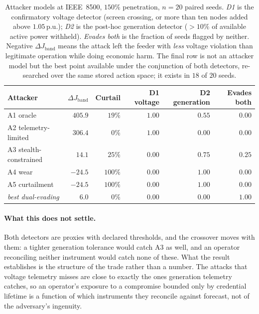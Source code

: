 \begin{table}[t]
\centering
\caption{Attacker models at IEEE~8500, $150\%$ penetration, $n{=}20$ paired seeds. \emph{D1} is
the confirmatory voltage detector (screen crossing, or more than ten nodes added above
$1.05$\,p.u.); \emph{D2} is the post-hoc generation detector ($>10\%$ of available active power
withheld). \emph{Evades both} is the fraction of seeds flagged by neither. Negative
$\Delta J_{\mathrm{band}}$ means the attack left the feeder with \emph{less} voltage violation than
legitimate operation while doing economic harm. The final row is not an attacker model but the
best point available under the conjunction of both detectors, re-searched over the same stored
action space; it exists in $18$ of $20$ seeds.}
\label{tab:attackers}
\small
\begin{tabular}{@{}lrrrrr@{}}
\toprule
Attacker & $\Delta J_{\mathrm{band}}$ & Curtail & D1 voltage & D2 generation & Evades both \\
\midrule
A1 oracle              & $405.9$  & $19\%$  & $1.00$ & $0.55$ & $0.00$ \\
A2 telemetry-limited   & $306.4$  & $0\%$   & $1.00$ & $0.00$ & $0.00$ \\
A3 stealth-constrained & $14.1$   & $25\%$  & $0.00$ & $0.75$ & $0.25$ \\
A4 wear                & $-24.5$  & $100\%$ & $0.00$ & $1.00$ & $0.00$ \\
A5 curtailment         & $-24.5$  & $100\%$ & $0.00$ & $1.00$ & $0.00$ \\
\midrule
\emph{best dual-evading} & $6.0$ & $0\%$ & $0.00$ & $0.00$ & $1.00$ \\
\bottomrule
\end{tabular}
\end{table}

\paragraph{What this does not settle.} Both detectors are proxies with declared thresholds, and
the crossover moves with them: a tighter generation tolerance would catch A3 as well, and an
operator reconciling neither instrument would catch none of these. What the result establishes is
the structure of the trade rather than a number. The attacks that voltage telemetry misses are
close to exactly the ones generation telemetry catches, so an operator's exposure to a compromise
bounded only by credential lifetime is a function of which instruments they reconcile against
forecast, not of the adversary's ingenuity.

